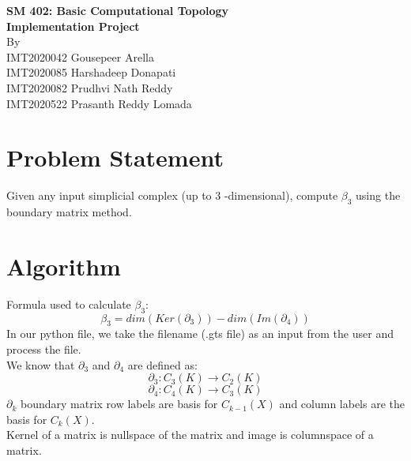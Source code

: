 \documentclass[11pt]{article}
\begin{document}
\begin{titlepage}
\begin{center}
\vspace*{0.5cm}
\Large{\textbf{SM 402: Basic Computational Topology}}\\
\Large{\textbf{Implementation Project}}\\
\vfill
\vfill
By \\ 
IMT2020042 Gousepeer Arella \\
IMT2020085 Harshadeep Donapati \\
IMT2020082 Prudhvi Nath Reddy \\
IMT2020522 Prasanth Reddy Lomada \\
\end{center}
\end{titlepage}

\tableofcontents
\thispagestyle{empty}
\clearpage
\setcounter{page}{1}

\section{Problem Statement}
Given any input simplicial complex (up to 3 -dimensional), compute $\beta_3$ 
using the boundary matrix method.

\section{Algorithm}
Formula used to calculate $\beta_3$: \\
\begin{equation}
    \beta_3 = dim(Ker(\partial_3)) - dim(Im(\partial_4))
\end{equation}
In our python file, we take the filename (.gts file) as an input from the user and process the file. \\
We know that $\partial_3$ and $\partial_4$ are defined as:
\begin{equation*}
    \partial_3 : C_{3}(K) \to C_{2}(K) 
\end{equation*}
\begin{equation*}
    \partial_4 : C_{4}(K) \to C_{3}(K)
\end{equation*}
$\partial_k$ boundary matrix row labels are basis for $C_{k-1}(X)$ and column labels are the basis for $C_{k}(X)$.  \\
Kernel of a matrix is nullspace of the matrix and image is columnspace of a matrix.
\end{document}
